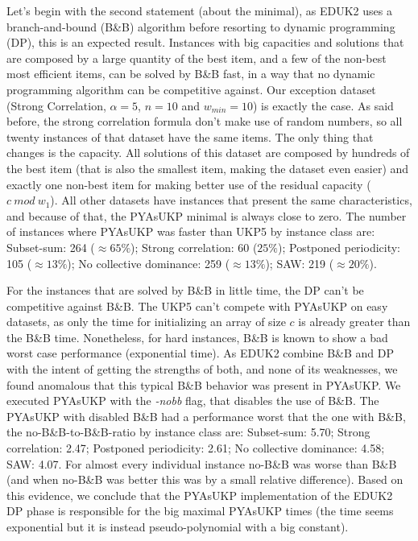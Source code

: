 \documentclass[runningheads,a4paper]{llncs}
\begin{document}
Let's begin with the second statement (about the minimal), as EDUK2 uses a branch-and-bound (B\&B) algorithm before resorting to dynamic programming (DP), this is an expected result. Instances with big capacities and solutions that are composed by a large quantity of the best item, and a few of the non-best most efficient items, can be solved by B\&B fast, in a way that no dynamic programming algorithm can be competitive against. Our exception dataset (Strong Correlation, \(\alpha = 5\), \(n = 10\) and \(w_{min} = 10\)) is exactly the case. As said before, the strong correlation formula don't make use of random numbers, so all twenty instances of that dataset have the same items. The only thing that changes is the capacity. All solutions of this dataset are composed by hundreds of the best item (that is also the smallest item, making the dataset even easier) and exactly one non-best item for making better use of the residual capacity (\(c~mod~w_1\)). All other datasets have instances that present the same characteristics, and because of that, the PYAsUKP minimal is always close to zero. The number of instances where PYAsUKP was faster than UKP5 by instance class are: Subset-sum: 264 (\(\approx65\%\)); Strong correlation: 60 (\(25\%\)); Postponed periodicity: 105 (\(\approx13\%\)); No collective dominance: 259 (\(\approx13\%\)); SAW: 219 (\(\approx20\%\)).


For the instances that are solved by B\&B in little time, the DP can't be competitive against B\&B. The UKP5 can't compete with PYAsUKP on easy datasets, as only the time for initializing an array of size \(c\) is already greater than the B\&B time. Nonetheless, for hard instances, B\&B is known to show a bad worst case performance (exponential time). As EDUK2 combine B\&B and DP with the intent of getting the strengths of both, and none of its weaknesses, we found anomalous that this typical B\&B behavior was present in PYAsUKP. We executed PYAsUKP with the \emph{-nobb} flag, that disables the use of B\&B. The PYAsUKP with disabled B\&B had a performance worst that the one with B\&B, the no-B\&B-to-B\&B-ratio by instance class are: Subset-sum: 5.70; Strong correlation: 2.47; Postponed periodicity: 2.61; No collective dominance: 4.58; SAW: 4.07. For almost every individual instance no-B\&B was worse than B\&B (and when no-B\&B was better this was by a small relative difference). Based on this evidence, we conclude that the PYAsUKP implementation of the EDUK2 DP phase is responsible for the big maximal PYAsUKP times (the time seems exponential but it is instead pseudo-polynomial with a big constant).
\end{document}

